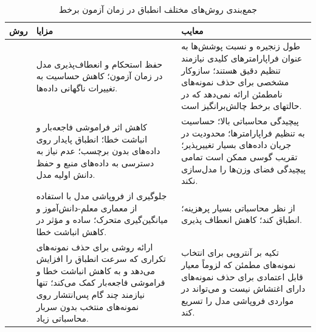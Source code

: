 \begin{table}[h!]\ContinuedFloat
	\centering
	\small
	\caption{جمع‌بندی روش‌های مختلف انطباق در زمان آزمون برخط}
	\begin{tabular}{p{2.5cm} p{6cm} p{6cm}}
		\toprule
		\textbf{روش} & \textbf{مزایا} & \textbf{معایب} \\ 
		\midrule
		\lr{REM}\cite{rem} & حفظ استحکام و انعطاف‌پذیری مدل در زمان آزمون؛ کاهش حساسیت به تغییرات ناگهانی داده‌ها. & طول زنجیره و نسبت پوشش‌ها به عنوان فراپارامترهای کلیدی نیازمند تنظیم دقیق هستند؛ سازوکار مشخصی برای حذف نمونه‌های نامطمئن ارائه نمی‌دهد که در حالتهای برخط چالش‌برانگیز است. \\ 
		\midrule
		\lr{PETAL}\cite{petal} & کاهش اثر فراموشی فاجعه‌بار و انباشت خطا؛ انطباق پایدار روی داده‌های بدون برچسب؛ عدم نیاز به دسترسی به داده‌های منبع و حفظ دانش اولیه مدل. & پیچیدگی محاسباتی بالا؛ حساسیت به تنظیم فراپارامترها؛ محدودیت در جریان داده‌های بسیار تغییرپذیر؛ تقریب گوسی ممکن است تمامی پیچیدگی فضای وزن‌ها را مدل‌سازی نکند. \\ 
		\midrule
		\lr{COTTA}\cite{cotta} & جلوگیری از فروپاشی مدل با استفاده از معماری معلم-دانش‌آموز و میانگین‌گیری متحرک؛ ساده و مؤثر در کاهش انباشت خطا. & از نظر محاسباتی بسیار پرهزینه؛ انطباق کند؛ کاهش انعطاف ‌پذیری. \\ 
		\midrule
		\lr{EATA}\cite{eata} & ارائه روشی برای حذف نمونه‌های تکراری که سرعت انطباق را افزایش می‌دهد و به کاهش انباشت خطا و فراموشی فاجعه‌بار کمک می‌کند؛ تنها نیازمند چند گام پس‌انتشار روی نمونه‌های منتخب بدون سربار محاسباتی زیاد. & تکیه بر آنتروپی برای انتخاب نمونه‌های مطمئن که لزوماً معیار قابل اعتمادی برای حذف نمونه‌های دارای اغتشاش نیست و می‌تواند در مواردی فروپاشی مدل را تسریع کند. \\ 
		\bottomrule
	\end{tabular}
\end{table}